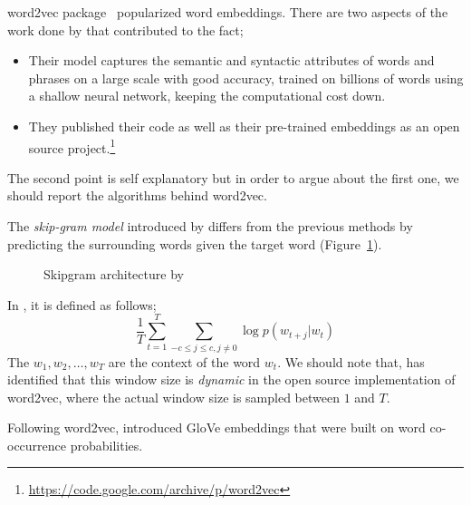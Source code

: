 word2vec package~\cite{mikolov_efficient_2013,mikolovDistributed2013,mikolov_linguistic_2013} popularized word embeddings.
There are two aspects of the work done by \citeauthor{mikolovDistributed2013}  that contributed to the fact;
\begin{itemize}
    \item Their model captures the semantic and syntactic attributes of words and phrases on a large scale with good accuracy, trained on billions of words using a shallow neural network, keeping the computational cost down.
    \item They published their code as well as their pre-trained embeddings as an open source project.\footnote{\url{https://code.google.com/archive/p/word2vec}}
\end{itemize}
The second point is self explanatory but in order to argue about the first one, we should report the algorithms behind word2vec.

The \emph{skip-gram model} introduced by \textcite{mikolov_efficient_2013} differs from the previous methods by predicting the surrounding words given the target word (Figure~\ref{fig:skipgram}).

\begin{figure}[htbp]
    \centering
    \caption{Skipgram architecture by \textcite{mikolovDistributed2013}}%
    \label{fig:skipgram}
\end{figure}

In , it is defined as follows;
\begin{equation}
    \frac{1}{T}\sum_{t=1}^{T}\sum_{-c \leq j \leq c, j \neq 0} \log p(w_{t+j}|w_t)
\end{equation}
The $w_{1}, w_{2}, \dots, w_{T}$ are the context of the word $w_t$.
We should note that, \textcite{levy_improving_2015} has identified that this window size is \emph{dynamic} in the open source implementation of word2vec, where the actual window size is sampled between $1$ and $T$.

Following word2vec, \textcite{pennington_glove_2014} introduced GloVe embeddings that were built on word co-occurrence probabilities.


